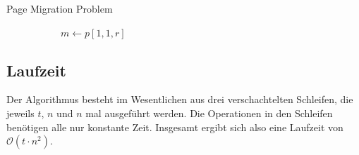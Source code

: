 \begin{algorithm}
	\caption{Page Migration Problem}
	\begin{algorithmic}[1]
			 
				 
					 
				\EndFor\
			\EndFor\
			\Statex\
			 
				 
						\State{$\pi_i \gets j$}
						\State{\textbf{break}}
					\EndIf\
				\EndFor\
				 
					 
						 
					\EndFor\
				\EndFor\
			\EndFor\
			\Statex\
			\For{$r \gets 1 \ato n$} 
				\If{$p[1, 1, r] < m$}
					$m \gets p[1, 1, r]$
				\EndIf\
			\EndFor\
			\Statex\
			\State{\Return{$m$}}
		\EndFunction{}
	\end{algorithmic}
\end{algorithm}

\subsection{Laufzeit}
\label{sub:Laufzeit}

Der Algorithmus besteht im Wesentlichen aus drei verschachtelten Schleifen, die jeweils $t$, $n$ und $n$ mal ausgeführt werden. Die Operationen in den Schleifen benötigen alle nur konstante Zeit. Insgesamt ergibt sich also eine Laufzeit von $\mathcal{O}(t \cdot n^2)$.


